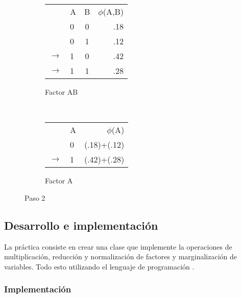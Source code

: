 \begin{figure}[H]
    \centering
    \begin{subfigure}[b]{0.4\textwidth}
        \centering
        \begin{tabular}{ l l  c | r }
           & A & B & $\phi$(A,B)\\ \cline{2-4}
           & 0 & 0 & .18  \\ \cline{2-4}
           & 0 & 1 & .12  \\ \cline{2-4}
          \(\to\) & 1 & 0 & .42  \\ \cline{2-4}
          \(\to\) & 1 & 1 & .28  \\
        \end{tabular}
        \caption{Factor AB}
    \end{subfigure}
    ~ 
    \begin{subfigure}[b]{0.4\textwidth}
        \centering
        \begin{tabular}{l  l | r }
            & A & $\phi$(A)\\ \cline{2-3}
            & 0 & (.18)+(.12)  \\ \cline{2-3}
        \(\to\) & 1 & (.42)+(.28)  \\
        \end{tabular}
        \caption{Factor A}
    \end{subfigure}
    \caption{Paso 2}
\end{figure}


\subsection{Desarrollo e implementaci\'on}

\noindent La práctica consiste en crear una clase  que implemente la operaciones de multiplicación, reducción y normalización de factores y marginalización de variables. Todo esto utilizando el lenguaje de programación .


\subsubsection{Implementaci\'on}

